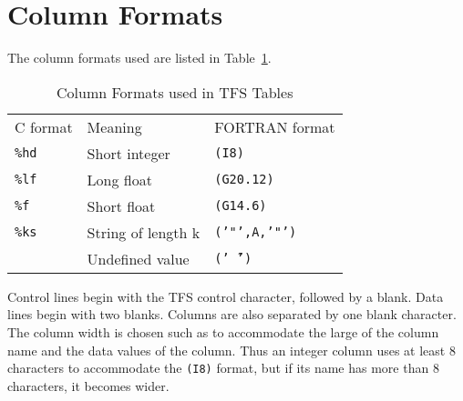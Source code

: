 \section{Column Formats}
The column formats used are listed in Table~\ref{T-TFS}.
\begin{table}[ht]
\caption{Column Formats used in TFS Tables}
\label{T-TFS}
\vspace{1ex}
\centering
\begin{tabular}{|l|p{}|l|}
\hline
C format   &Meaning            &FORTRAN format \\
{\tt \%hd} &Short integer      &{\tt (I8)} \\
{\tt \%lf} &Long float         &{\tt (G20.12)} \\
{\tt \%f}  &Short float        &{\tt (G14.6)} \\
{\tt \%ks} &String of length k &{\tt ('"',A,'"')} \\
           &Undefined value    &{\tt ('\~\ ')} \\
\hline
\end{tabular}
\end{table}
Control lines begin with the TFS control character, followed by a blank.
Data lines begin with two blanks.
Columns are also separated by one blank character.
The column width is chosen such as to accommodate the large of the
column name and the data values of the column.
Thus an integer column uses at least 8 characters to accommodate
the {\tt (I8)} format,
but if its name has more than 8 characters, it becomes wider.
 
